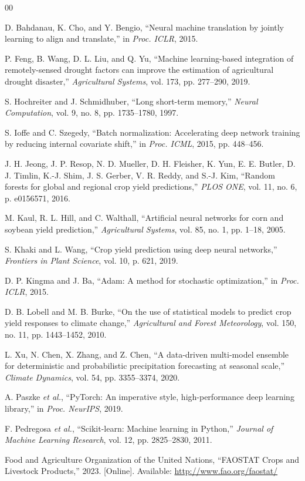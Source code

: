 \documentclass[conference]{IEEEtran}
\begin{document}

\begin{thebibliography}{00}

D. Bahdanau, K. Cho, and Y. Bengio,
``Neural machine translation by jointly learning to align and translate,''
in \textit{Proc. ICLR}, 2015.

P. Feng, B. Wang, D. L. Liu, and Q. Yu,
``Machine learning-based integration of remotely-sensed drought factors can improve
the estimation of agricultural drought disaster,''
\textit{Agricultural Systems}, vol. 173, pp. 277--290, 2019.

S. Hochreiter and J. Schmidhuber,
``Long short-term memory,''
\textit{Neural Computation}, vol. 9, no. 8, pp. 1735--1780, 1997.

S. Ioffe and C. Szegedy,
``Batch normalization: Accelerating deep network training by reducing internal
covariate shift,''
in \textit{Proc. ICML}, 2015, pp. 448--456.

J. H. Jeong, J. P. Resop, N. D. Mueller, D. H. Fleisher, K. Yun, E. E. Butler,
D. J. Timlin, K.-J. Shim, J. S. Gerber, V. R. Reddy, and S.-J. Kim,
``Random forests for global and regional crop yield predictions,''
\textit{PLOS ONE}, vol. 11, no. 6, p. e0156571, 2016.

M. Kaul, R. L. Hill, and C. Walthall,
``Artificial neural networks for corn and soybean yield prediction,''
\textit{Agricultural Systems}, vol. 85, no. 1, pp. 1--18, 2005.

S. Khaki and L. Wang,
``Crop yield prediction using deep neural networks,''
\textit{Frontiers in Plant Science}, vol. 10, p. 621, 2019.

D. P. Kingma and J. Ba,
``Adam: A method for stochastic optimization,''
in \textit{Proc. ICLR}, 2015.

D. B. Lobell and M. B. Burke,
``On the use of statistical models to predict crop yield responses to climate change,''
\textit{Agricultural and Forest Meteorology}, vol. 150, no. 11, pp. 1443--1452, 2010.

L. Xu, N. Chen, X. Zhang, and Z. Chen,
``A data-driven multi-model ensemble for deterministic and probabilistic
precipitation forecasting at seasonal scale,''
\textit{Climate Dynamics}, vol. 54, pp. 3355--3374, 2020.

A. Paszke \textit{et al.},
``PyTorch: An imperative style, high-performance deep learning library,''
in \textit{Proc. NeurIPS}, 2019.

F. Pedregosa \textit{et al.},
``Scikit-learn: Machine learning in Python,''
\textit{Journal of Machine Learning Research}, vol. 12, pp. 2825--2830, 2011.

Food and Agriculture Organization of the United Nations,
``FAOSTAT Crops and Livestock Products,''
2023. [Online]. Available: \url{http://www.fao.org/faostat/}

\end{thebibliography}
\end{document}
